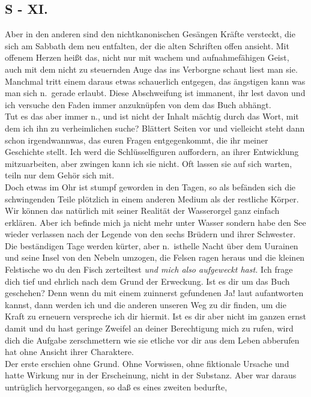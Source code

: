 \documentclass[
]{article}
\author{}
\date{\vspace{-2.5em}}
\begin{document}
\subsection{S - XI.}\label{s---xi.}

Aber in den anderen sind den nichtkanonischen Gesängen Kräfte versteckt,
die sich am Sabbath dem neu entfalten, der die alten Schriften offen
ansieht. Mit offenem Herzen heißt das, nicht nur mit wachem und
aufnahmefähigen Geist, auch mit dem nicht zu steuernden Auge das ins
Verborgne schaut liest man sie. Manchmal tritt einem daraus etwas
schauerlich entgegen, das ängstigen kann was man sich n.~gerade erlaubt.
Diese Abschweifung ist immanent, ihr lest davon und ich versuche den
Faden immer anzuknüpfen von dem das Buch abhängt.\\
Tut es das aber immer n., und ist nicht der Inhalt mächtig durch das
Wort, mit dem ich ihn zu verheimlichen suche? Blättert Seiten vor und
vielleicht steht dann schon irgendwannwas, das euren Fragen
entgegenkommt, die ihr meiner Geschichte stellt. Ich werd die
Schlüsselfiguren auffordern, an ihrer Entwicklung mitzuarbeiten, aber
zwingen kann ich sie nicht. Oft lassen sie auf sich warten, teiln nur
dem Gehör sich mit.\\
Doch etwas im Ohr ist stumpf geworden in den Tagen, so als befänden sich
die schwingenden Teile plötzlich in einem anderen Medium als der
restliche Körper. Wir können das natürlich mit seiner Realität der
Wasserorgel ganz einfach erklären. Aber ich befinde mich ja nicht mehr
unter Wasser sondern habe den See wieder verlassen nach der Legende von
den sechs Brüdern und ihrer Schwester. Die beständigen Tage werden
kürter, aber n.~isthelle Nacht über dem Uurainen und seine Insel von den
Nebeln umzogen, die Felsen ragen heraus und die kleinen Felstische wo du
den Fisch zerteiltest \emph{und mich also aufgeweckt hast.} Ich frage
dich tief und ehrlich nach dem Grund der Erweckung. Ist es dir um das
Buch geschehen? Denn wenn du mit einem zuinnerst gefundenen Ja! laut
aufantworten kannst, dann werden ich und die anderen unseren Weg zu dir
finden, um die Kraft zu erneuern verspreche ich dir hiermit. Ist es dir
aber nicht im ganzen ernst damit und du hast geringe Zweifel an deiner
Berechtigung mich zu rufen, wird dich die Aufgabe zerschmettern wie sie
etliche vor dir aus dem Leben abberufen hat ohne Ansicht ihrer
Charaktere.\\
Der erste erschien ohne Grund. Ohne Vorwissen, ohne fiktionale Ursache
und hatte Wirkung nur in der Erscheinung, nicht in der Substanz. Aber
war daraus untrüglich hervorgegangen, so daß es eines zweiten bedurfte,
\end{document}
